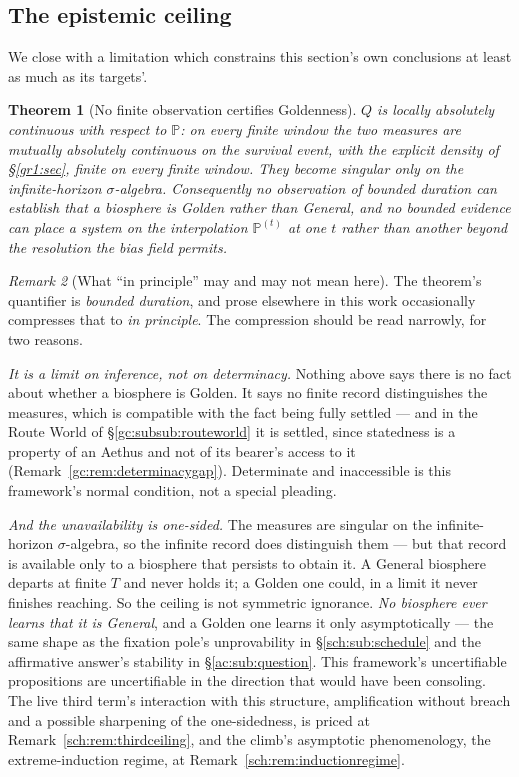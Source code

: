 \documentclass[11pt]{article}
\numberwithin{equation}{section}
\theoremstyle{plain}
\newtheorem{theorem}{Theorem}[section]
\theoremstyle{definition}
\theoremstyle{remark}
\newtheorem{remark}[theorem]{Remark}
\newcommand{\PP}{\mathbb{P}}
\begin{document}
\subsection{The epistemic ceiling}\label{gr:sub:ceiling}

We close with a limitation which constrains this section's own
conclusions at least as much as its targets'.

\begin{theorem}[No finite observation certifies Goldenness]
\label{gr:thm:ceiling}
$Q$ is locally absolutely continuous with respect to $\PP$: on every
finite window the two measures are mutually absolutely continuous on the
survival event, with the explicit density of \S\ref{gr1:sec}, finite on
every finite window. They
become singular only on the infinite-horizon $\sigma$-algebra.
Consequently no observation of bounded duration can establish that a
biosphere is Golden rather than General, and no bounded evidence can
place a system on the interpolation $\PP^{(t)}$ at one $t$ rather than
another beyond the resolution the bias field permits.
\end{theorem}

\begin{remark}[What ``in principle'' may and may not mean here]
\label{gr:rem:ceilingscope}
The theorem's quantifier is \emph{bounded duration}, and prose elsewhere
in this work occasionally compresses that to \emph{in principle}. The
compression should be read narrowly, for two reasons.

\emph{It is a limit on inference, not on determinacy.} Nothing above says
there is no fact about whether a biosphere is Golden. It says no finite
record distinguishes the measures, which is compatible with the fact
being fully settled --- and in the Route World of
\S\ref{gc:subsub:routeworld} it is settled, since statedness is a
property of an Aethus and not of its bearer's access to it
(Remark~\ref{gc:rem:determinacygap}). Determinate and inaccessible is
this framework's normal condition, not a special pleading.

\emph{And the unavailability is one-sided.} The measures are singular on
the infinite-horizon $\sigma$-algebra, so the infinite record does
distinguish them --- but that record is available only to a biosphere
that persists to obtain it. A General biosphere departs at finite $T$ and
never holds it; a Golden one could, in a limit it never finishes
reaching. So the ceiling is not symmetric ignorance. \emph{No biosphere
ever learns that it is General}, and a Golden one learns it only
asymptotically --- the same shape as the fixation pole's unprovability in
\S\ref{sch:sub:schedule} and the affirmative answer's stability in
\S\ref{ac:sub:question}. This framework's uncertifiable propositions are
uncertifiable in the direction that would have been consoling. The
live third term's interaction with this structure, amplification
without breach and a possible sharpening of the one-sidedness, is
priced at Remark~\ref{sch:rem:thirdceiling}, and the climb's
asymptotic phenomenology, the extreme-induction regime, at
Remark~\ref{sch:rem:inductionregime}.
\end{remark}
\end{document}
